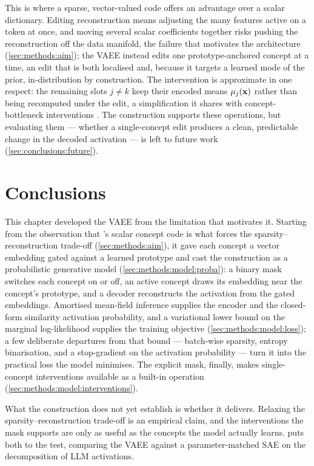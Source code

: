 This is where a sparse, vector-valued code offers an advantage over a scalar
dictionary. Editing  reconstruction means adjusting the many features
active on a token at once, and moving several scalar coefficients together risks
pushing the reconstruction off the data manifold, the failure that motivates
the architecture (\cref{sec:methods:aim}); the
\ac{VAEE} instead edits one prototype-anchored concept at a time, an edit that
is both localised and, because it targets a learned mode of the prior,
in-distribution by construction. The intervention is approximate in one respect:
the remaining slots $j \ne k$ keep their encoded means $\vb{\mu}_j(\vb{x})$
rather than being recomputed under the edit, a simplification it shares with
concept-bottleneck interventions \citep{kohConceptBottleneckModels2020}. The
construction supports these operations, but evaluating them --- whether a
single-concept edit produces a clean, predictable change in the decoded
activation --- is left to future work
(\cref{sec:conclusions:future}).

\section*{Conclusions}

This chapter developed the \ac{VAEE} from the limitation that motivates it.
Starting from the observation that 's scalar concept code is what
forces the sparsity--reconstruction trade-off
(\cref{sec:methods:aim}), it gave each concept a
vector embedding gated against a learned prototype and cast the construction as
a probabilistic generative model
(\cref{sec:methods:model:proba}):
a binary mask switches each concept on or off, an active concept draws its
embedding near the concept's prototype, and a decoder reconstructs the
activation from the gated embeddings. Amortised mean-field inference supplies
the encoder and the closed-form similarity activation probability, and a
variational lower bound on the marginal log-likelihood supplies the training
objective
(\cref{sec:methods:model:loss}); a few
deliberate departures from that bound --- batch-wise sparsity, entropy
binarisation, and a stop-gradient on the activation probability --- turn it into
the practical loss the model minimises. The explicit mask, finally, makes
single-concept interventions available as a built-in operation
(\cref{sec:methods:model:interventions}).

What the construction does not yet establish is whether it delivers. Relaxing
the sparsity--reconstruction trade-off is an empirical claim, and the
interventions the mask supports are only as useful as the concepts the model
actually learns.  puts both to the test,
comparing the \ac{VAEE} against a parameter-matched \ac{SAE} on the
decomposition of \ac{LLM} activations.


